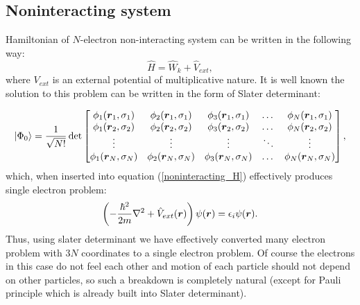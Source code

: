 \documentclass[openany, longbibliography,slovene,a4paper,12pt]{article}
\def\vec#1{\mbox{\boldmath$#1$}}
\begin{document}
\subsection{Noninteracting system}
Hamiltonian of $N$-electron non-interacting system can be written in the
following way:
 \begin{equation} \label{noninteracting_H}
   \hat H =\hat  W_k + \hat V_{ext}, 
 \end{equation}
 where $V_{ext}$ is an external potential of multiplicative nature. It is well
 known the solution to this problem can be written in the form of Slater determinant:

 \[
       \ket{\Phi_0} = \frac{1}{\sqrt{N!}}\det 
   \begin{bmatrix}
   \phi_{1}(\vec r_1, \sigma_1) & \phi_{2}(\vec r_1, \sigma_1) & \phi_{3}(\vec
   r_1, \sigma_1) & \dots & \phi_{N}(\vec r_1, \sigma_1) \\
    \phi_{1}(\vec r_2, \sigma_2) & \phi_{2}(\vec r_2, \sigma_2) & \phi_{3}(\vec
    r_2, \sigma_2) & \dots & \phi_{N}(\vec r_2, \sigma_2) \\
    \vdots & \vdots & \vdots & \ddots & \vdots \\
     \phi_{1}(\vec r_N, \sigma_N) & \phi_{2}(\vec r_N, \sigma_N) & \phi_{3}(\vec r_N, \sigma_N) & \dots & \phi_{N}(\vec r_N, \sigma_N) \\
\end{bmatrix},
\]
 which, when inserted into equation (\ref{noninteracting_H}) effectively produces
 single electron problem:
 \begin{equation}
   \left(-\frac{\hbar^2}{2m}\nabla^2 + \hat V_{ext}(\vec r)\right) \psi (\vec r) = \epsilon_i \psi(\vec r).
 \end{equation}
 Thus, using slater determinant we have effectively converted many electron
 problem with $3N$ coordinates to a single electron problem. Of course the
 electrons in this case do not feel each other and motion of each particle
 should not depend on other particles, so such a breakdown is completely natural
 (except for Pauli principle which is already built into Slater determinant).
 
\end{document}
